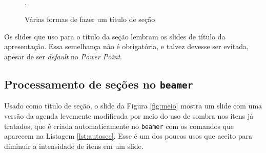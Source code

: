 \begin{figure}[htb]
    \centering
    \\
        \caption{Várias formas de fazer um título de seção}.
        \label{fig:sectitles}
    \end{figure}


Os slides que uso para o título da seção lembram os slides de título da apresentação. Essa semelhança não é obrigatória, e talvez devesse ser evitada, apesar de ser \textit{default} no \textit{Power Point}.

\subsection{Processamento de seções no \texttt{beamer}}

 Usado como título de seção, o slide da Figura \ref{fig:meio} mostra um slide com uma versão da agenda levemente modificada por meio do uso de sombra nos itens já tratados, que é criada automaticamente no \texttt{beamer} com os comandos que aparecem na Listagem \ref{lst:autosec}. Esse é um dos poucos usos que aceito para diminuir a intensidade de itens em um slide.

